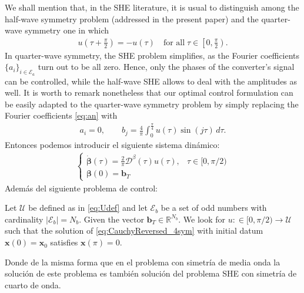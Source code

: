 \vspace{1em}
\begin{remark}
    We shall mention that, in the SHE literature, it is usual to distinguish among the half-wave symmetry problem (addressed in the present paper) and the quarter-wave symmetry one in which
    \begin{align*}
        u\left(\tau + \frac \pi2\right) = -u(\tau)\quad \mbox{for all}\; \tau \in \left[0,\frac \pi2\right).
    \end{align*}
    In quarter-wave symmetry, the SHE problem simplifies, as the Fourier coefficients $\{a_i\}_{i\in\mathcal E_a}$ turn out to be all zero. Hence, only the phases of the converter's signal can be controlled, while the half-wave SHE allows to deal with the amplitudes as well. It is worth to remark nonetheless that our optimal control formulation can be easily adapted to the quarter-wave symmetry problem by simply replacing the Fourier coefficients \eqref{eq:an} with
    \begin{align*}
        a_i = 0, \quad\quad b_j = \frac{4}{\pi} \int_0^{\frac \pi4} u(\tau)  \sin(j \tau)\,d\tau.
    \end{align*}
    Entonces podemos introducir el siguiente sistema dinámico:
    \begin{gather}
        \begin{cases}
            \displaystyle \dot{\bm{\beta}}(\tau) = \frac 2\pi \bm{\mathcal{D}}^\beta(\tau) u(\tau), & \tau \in [0,\pi/2)
            \\[6pt]
            \bm{\beta}(0) = \bm{b}_T
        \end{cases}\label{eq:CauchyReversed_4sym}
    \end{gather}
    Además del siguiente problema de control:
    \vspace{0.5em}
    \begin{problem}\label{pb:SHEpControl_4sym}
        Let $\mathcal{U}$ be defined as in \eqref{eq:Udef} and let $\mathcal{E} _b $ be a set of odd numbers with cardinality $ |\mathcal{E} _b| = N_b$. Given the vector $\bm{b}_T \in \mathbb{R}^{N_b} $. We look for $u:\in [0,\pi/2)\to\mathcal{U}$ such that the solution of \eqref{eq:CauchyReversed_4sym} with initial datum $\bm{x}(0)=\bm{x}_0$ satisfies $\bm{x}(\pi)=0$.
    \end{problem}
    Donde de la misma forma que en el problema con simetría de media onda la solución de este problema es también solución del problema SHE con simetría de cuarto de onda.
\end{remark} 